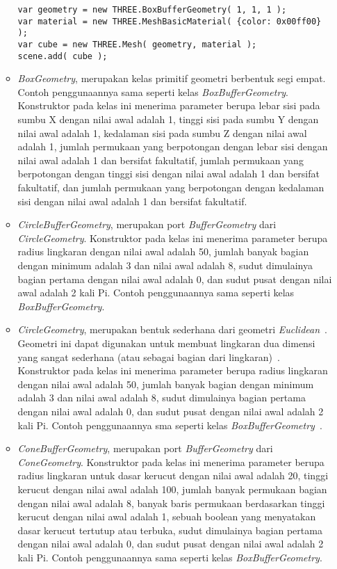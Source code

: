 \begin{itemize}
\begin{itemize}
\begin{lstlisting}[caption={Contoh penggunaan kelas {\it BoxBufferGeometry}.}, label={lst:boxBufferGeo},captionpos=b]
var geometry = new THREE.BoxBufferGeometry( 1, 1, 1 );
var material = new THREE.MeshBasicMaterial( {color: 0x00ff00} );
var cube = new THREE.Mesh( geometry, material );
scene.add( cube );
\end{lstlisting}
		\item {\it BoxGeometry}, merupakan kelas primitif geometri berbentuk segi empat. Contoh penggunaannya sama seperti kelas {\it BoxBufferGeometry}. Konstruktor pada kelas ini menerima parameter berupa lebar sisi pada sumbu X dengan nilai awal adalah 1, tinggi sisi pada sumbu Y dengan nilai awal adalah 1, kedalaman sisi pada sumbu Z dengan nilai awal adalah 1, jumlah permukaan yang berpotongan dengan lebar sisi dengan nilai awal adalah 1 dan bersifat fakultatif,  jumlah permukaan yang berpotongan dengan tinggi sisi dengan nilai awal adalah 1 dan bersifat fakultatif,  dan jumlah permukaan yang berpotongan dengan kedalaman sisi dengan nilai awal adalah 1 dan bersifat fakultatif.
		\item {\it CircleBufferGeometry}, merupakan port {\it BufferGeometry} dari {\it CircleGeometry}. Konstruktor pada kelas ini menerima parameter berupa radius lingkaran dengan nilai awal adalah 50, jumlah banyak bagian dengan minimum adalah 3 dan nilai awal adalah 8, sudut dimulainya bagian pertama dengan nilai awal adalah 0, dan sudut pusat dengan nilai awal adalah 2 kali Pi. Contoh penggunaannya sama seperti kelas {\it BoxBufferGeometry}.
		\item {\it CircleGeometry}, merupakan bentuk sederhana dari geometri {\it Euclidean}~\cite{threejs}. Geometri ini dapat digunakan untuk membuat lingkaran dua dimensi yang sangat sederhana (atau sebagai bagian dari lingkaran)~\cite{learningThreejs}. Konstruktor pada kelas ini menerima parameter berupa radius lingkaran dengan nilai awal adalah 50, jumlah banyak bagian dengan minimum adalah 3 dan nilai awal adalah 8, sudut dimulainya bagian pertama dengan nilai awal adalah 0, dan sudut pusat dengan nilai awal adalah 2 kali Pi. Contoh penggunaannya sma seperti kelas {\it BoxBufferGeometry}~\cite{threejs}.
		\item {\it ConeBufferGeometry}, merupakan port {\it BufferGeometry} dari {\it ConeGeometry}. Konstruktor pada kelas ini menerima parameter berupa radius lingkaran untuk dasar kerucut dengan nilai awal adalah 20, tinggi kerucut dengan nilai awal adalah 100, jumlah banyak permukaan bagian dengan nilai awal adalah 8, banyak baris permukaan berdasarkan tinggi kerucut dengan nilai awal adalah 1, sebuah boolean yang menyatakan dasar kerucut tertutup atau terbuka, sudut dimulainya bagian pertama dengan nilai awal adalah 0, dan sudut pusat dengan nilai awal adalah 2 kali Pi. Contoh penggunaannya sama seperti kelas {\it BoxBufferGeometry}.

\end{itemize}
\end{itemize}
